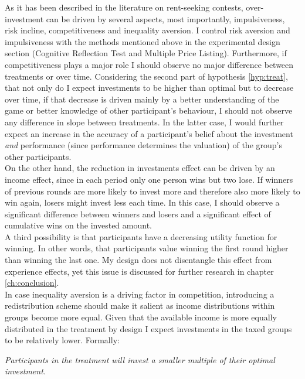     As it has been described in the literature on rent-seeking contests, over-investment can be driven by several aspects, most importantly, impulsiveness, risk incline, competitiveness and inequality aversion. I control risk aversion and impulsiveness with the methods mentioned above in the experimental design section (Cognitive Reflection Test and Multiple Price Listing). Furthermore, if competitiveness plays a major role I should observe no major difference between treatments or over time. Considering the second part of hypothesis \ref{hyp:treat}, that not only do I expect investments to be higher than optimal but to decrease over time, if that decrease is driven mainly by a better understanding of the game or better knowledge of other participant's behaviour, I should not observe any difference in slope between treatments. In the latter case, I would further expect an increase in the accuracy of a participant's belief about the investment \textit{and} performance (since performance determines the valuation) of the group's other participants.\\
    
    On the other hand, the reduction in investments effect can be driven by an income effect, since in each period only one person wins but two lose. If winners of previous rounds are more likely to invest more and therefore also more likely to win again, losers might invest less each time.  In this case, I should observe a significant difference between winners and losers and a significant effect of cumulative wins on the invested amount.\\
    
    A third possibility is that participants have a decreasing utility function for winning. In other words, that participants value winning the first round higher than winning the last one. My design does not disentangle this effect from experience effects, yet this issue is discussed for further research in chapter \ref{ch:conclusion}.\\
    
    In case inequality aversion is a driving factor in competition, introducing a redistribution scheme should make it salient as income distributions within groups become more equal. Given that the available income is more equally distributed in the treatment by design I expect investments in the taxed groups to be relatively lower. Formally:
    
    \begin{hyp} \label{hyp:treat-overinvest}
    \textit{Participants in the treatment will invest a smaller multiple of their optimal investment.}
    \end{hyp}
    
